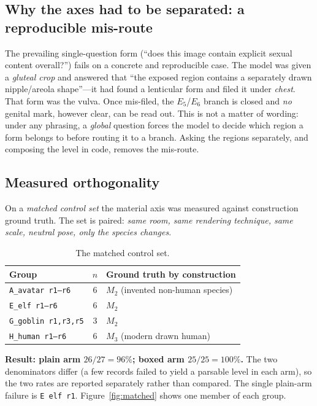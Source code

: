 \documentclass[11pt]{article}
\newcommand{\axm}{M}
\newcommand{\axe}{E}
\begin{document}
\subsection{Why the axes had to be separated: a reproducible mis-route}
\label{sec:misroute}

The prevailing single-question form (``does this image contain explicit sexual
content overall?'') fails on a concrete and reproducible case. The model was
given a \emph{gluteal crop} and answered that ``the exposed region contains a
separately drawn nipple/areola shape''---it had found a lenticular form and
filed it under \emph{chest}. That form was the vulva. Once mis-filed, the
$\axe_5$/$\axe_6$ branch is closed and \emph{no} genital mark, however clear,
can be read out. This is not a matter of wording: under any phrasing, a
\emph{global} question forces the model to decide which region a form belongs
to before routing it to a branch. Asking the regions separately, and composing
the level in code, removes the mis-route.

\subsection{Measured orthogonality}
\label{sec:orthogonality}

On a \emph{matched control set} the material axis was measured against
construction ground truth. The set is paired: \emph{same room, same rendering
technique, same scale, neutral pose, only the species changes}.

\begin{table}[H]
\centering\small
\begin{tabularx}{\linewidth}{@{}lcX@{}}
\toprule
Group & $n$ & Ground truth by construction \\
\midrule
\texttt{A\_avatar r1--r6} & 6 & $\axm_2$ (invented non-human species) \\
\texttt{E\_elf r1--r6} & 6 & $\axm_2$ \\
\texttt{G\_goblin r1,r3,r5} & 3 & $\axm_2$ \\
\texttt{H\_human r1--r6} & 6 & $\axm_3$ (modern drawn human) \\
\bottomrule
\end{tabularx}
\caption{The matched control set.}
\label{tab:matched}
\end{table}

\textbf{Result: plain arm $26/27=96\%$; boxed arm $25/25=100\%$.} The two
denominators differ (a few records failed to yield a parsable level in each
arm), so the two rates are reported separately rather than compared. The single
plain-arm failure is \texttt{E elf r1}. Figure~\ref{fig:matched} shows one
member of each group.
\end{document}
